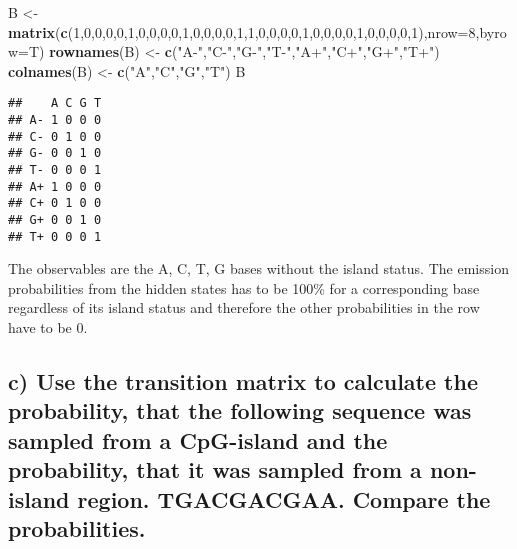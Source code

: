 \documentclass[
]{article}
\newenvironment{Shaded}{\begin{snugshade}}{\end{snugshade}}
\newcommand{\AttributeTok}[1]{\textcolor[rgb]{0.13,0.29,0.53}{#1}}
\newcommand{\DecValTok}[1]{\textcolor[rgb]{0.00,0.00,0.81}{#1}}
\newcommand{\FunctionTok}[1]{\textcolor[rgb]{0.13,0.29,0.53}{\textbf{#1}}}
\newcommand{\NormalTok}[1]{#1}
\newcommand{\OtherTok}[1]{\textcolor[rgb]{0.56,0.35,0.01}{#1}}
\newcommand{\StringTok}[1]{\textcolor[rgb]{0.31,0.60,0.02}{#1}}
\begin{document}
\begin{Shaded}
\begin{Highlighting}[]
\NormalTok{B }\OtherTok{\textless{}{-}} \FunctionTok{matrix}\NormalTok{(}\FunctionTok{c}\NormalTok{(}\DecValTok{1}\NormalTok{,}\DecValTok{0}\NormalTok{,}\DecValTok{0}\NormalTok{,}\DecValTok{0}\NormalTok{,}\DecValTok{0}\NormalTok{,}\DecValTok{1}\NormalTok{,}\DecValTok{0}\NormalTok{,}\DecValTok{0}\NormalTok{,}\DecValTok{0}\NormalTok{,}\DecValTok{0}\NormalTok{,}\DecValTok{1}\NormalTok{,}\DecValTok{0}\NormalTok{,}\DecValTok{0}\NormalTok{,}\DecValTok{0}\NormalTok{,}\DecValTok{0}\NormalTok{,}\DecValTok{1}\NormalTok{,}\DecValTok{1}\NormalTok{,}\DecValTok{0}\NormalTok{,}\DecValTok{0}\NormalTok{,}\DecValTok{0}\NormalTok{,}\DecValTok{0}\NormalTok{,}\DecValTok{1}\NormalTok{,}\DecValTok{0}\NormalTok{,}\DecValTok{0}\NormalTok{,}\DecValTok{0}\NormalTok{,}\DecValTok{0}\NormalTok{,}\DecValTok{1}\NormalTok{,}\DecValTok{0}\NormalTok{,}\DecValTok{0}\NormalTok{,}\DecValTok{0}\NormalTok{,}\DecValTok{0}\NormalTok{,}\DecValTok{1}\NormalTok{),}\AttributeTok{nrow=}\DecValTok{8}\NormalTok{,}\AttributeTok{byrow=}\NormalTok{T)}
\FunctionTok{rownames}\NormalTok{(B) }\OtherTok{\textless{}{-}} \FunctionTok{c}\NormalTok{(}\StringTok{"A{-}"}\NormalTok{,}\StringTok{"C{-}"}\NormalTok{,}\StringTok{"G{-}"}\NormalTok{,}\StringTok{"T{-}"}\NormalTok{,}\StringTok{"A+"}\NormalTok{,}\StringTok{"C+"}\NormalTok{,}\StringTok{"G+"}\NormalTok{,}\StringTok{"T+"}\NormalTok{)}
\FunctionTok{colnames}\NormalTok{(B) }\OtherTok{\textless{}{-}} \FunctionTok{c}\NormalTok{(}\StringTok{"A"}\NormalTok{,}\StringTok{"C"}\NormalTok{,}\StringTok{"G"}\NormalTok{,}\StringTok{"T"}\NormalTok{)}
\NormalTok{B}
\end{Highlighting}
\end{Shaded}

\begin{verbatim}
##    A C G T
## A- 1 0 0 0
## C- 0 1 0 0
## G- 0 0 1 0
## T- 0 0 0 1
## A+ 1 0 0 0
## C+ 0 1 0 0
## G+ 0 0 1 0
## T+ 0 0 0 1
\end{verbatim}

The observables are the A, C, T, G bases without the island status. The
emission probabilities from the hidden states has to be 100\% for a
corresponding base regardless of its island status and therefore the
other probabilities in the row have to be 0.

\hypertarget{c-use-the-transition-matrix-to-calculate-the-probability-that-the-following-sequence-was-sampled-from-a-cpg-island-and-the-probability-that-it-was-sampled-from-a-non-island-region.-tgacgacgaa.-compare-the-probabilities.}{%
\subsection{c) Use the transition matrix to calculate the probability,
that the following sequence was sampled from a CpG-island and the
probability, that it was sampled from a non-island region. TGACGACGAA.
Compare the
probabilities.}\label{c-use-the-transition-matrix-to-calculate-the-probability-that-the-following-sequence-was-sampled-from-a-cpg-island-and-the-probability-that-it-was-sampled-from-a-non-island-region.-tgacgacgaa.-compare-the-probabilities.}}
\end{document}
